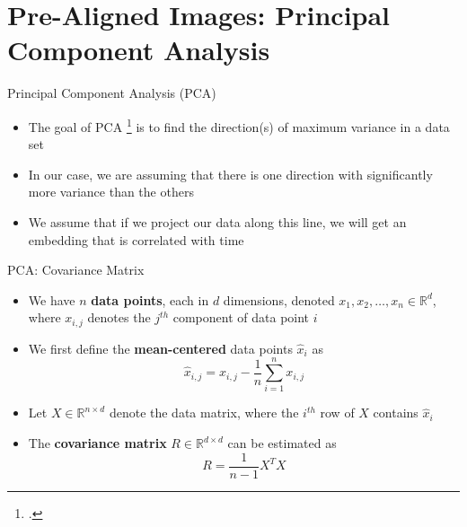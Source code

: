 \section{Pre-Aligned Images: Principal Component Analysis}

\begin{frame}{Principal Component Analysis (PCA)}
  \begin{itemize}
  \item The goal of PCA \footcite{shlens2005tutorial} is to find the direction(s) of maximum variance in a data set
  \item In our case, we are assuming that there is one direction with significantly more variance than the others
  \item We assume that if we project our data along this line, we will get an embedding that is correlated with time
  \end{itemize}
\end{frame}

\begin{frame}{PCA: Covariance Matrix}
  \begin{itemize}
  \item We have $n$ {\bf data points}, each in $d$ dimensions, denoted $x_1, x_2, \dots, x_n \in \mathbb{R}^d$, where $x_{i,j}$ denotes the $j^{th}$ component of data point $i$
  \item We first define the {\bf mean-centered} data points $\hat{x}_i$ as $$\hat{x}_{i,j} = x_{i,j} - \frac{1}{n} \sum_{i=1}^{n} x_{i,j}$$
  \item Let $X \in \mathbb{R}^{n \times d}$ denote the data matrix, where the $i^{th}$ row of $X$ contains $\hat{x}_i$
  \item The {\bf covariance matrix} $R \in \mathbb{R}^{d \times d}$ can be estimated as $$R = \frac{1}{n-1} X^T X$$
  \end{itemize}
\end{frame}

